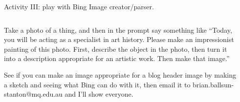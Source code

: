 \documentclass[aspectratio=169]{beamer}
\begin{document}
\begin{frame}{Activity III: play with Bing Image creator/parser.}

\begin{columns}
    \begin{column}{.5\textwidth}
        Take a photo of a thing, and then in the prompt say something like ``Today, you will be acting as a specialist in art history. Please make an impressionist painting of this photo. First, describe the object in the photo, then turn it into a description appropriate for an artistic work. Then make that image.'' 

See if you can make an image appropriate for a blog header image by making a sketch and seeing what Bing can do with it, then email it to brian.ballsun-stanton@mq.edu.au and I'll show everyone.
    \end{column}
    \begin{column}{.25\textwidth}

\end{column}
\end{columns}
\end{frame}
\end{document}
